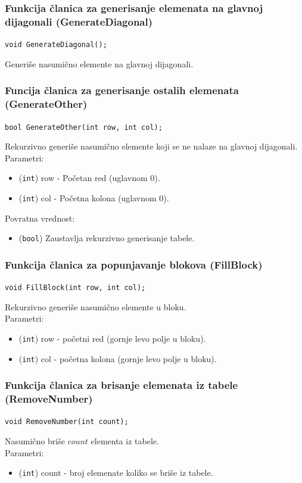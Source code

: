 \documentclass[a4paper]{article}
\begin{document}
    \subsubsection{Funkcija članica za generisanje elemenata na glavnoj dijagonali (GenerateDiagonal)}
	\texttt{void GenerateDiagonal();}
	\par Generiše nasumično elemente na glavnoj dijagonali.

    \subsubsection{Funcija članica za generisanje ostalih elemenata (GenerateOther)}
    \texttt{bool GenerateOther(int row, int col);}
    \par Rekurzivno generiše nasumično elemente koji se ne nalaze na glavnoj dijagonali.\\
	Parametri:
    \begin{itemize}
        \item (\texttt{int}) row - Početan red (uglavnom 0).
        \item (\texttt{int}) col - Početna kolona (uglavnom 0).
    \end{itemize}
    Povratna vrednost:
    \begin{itemize}
        \item (\texttt{bool}) Zaustavlja rekurzivno generisanje tabele.
    \end{itemize}
    
    \subsubsection{Funkcija članica za popunjavanje blokova (FillBlock)}
    \texttt{void FillBlock(int row, int col);}
    \par Rekurzivno generiše nasumično elemente u bloku.\\
    Parametri:
    \begin{itemize}
        \item (\texttt{int}) row - početni red (gornje levo polje u bloku).
        \item (\texttt{int}) col - početna kolona (gornje levo polje u bloku).
    \end{itemize}

    \subsubsection{Funkcija članica za brisanje elemenata iz tabele (RemoveNumber)}
	\texttt{void RemoveNumber(int count);}
    \par Nasumično briše $count$ elementa iz tabele.\\
    Parametri:
    \begin{itemize}
        \item (\texttt{int}) count - broj elemenate koliko se briše iz tabele.
    \end{itemize}
\end{document}
